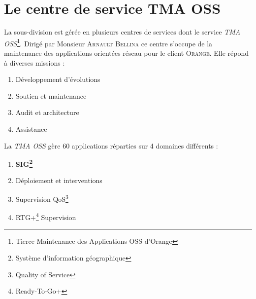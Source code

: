 \section{Le centre de service TMA OSS}

La sous-division est gérée en plusieurs centres de services dont le service \textit{TMA OSS}\footnote{Tierce Maintenance des Applications OSS d’Orange}.
Dirigé par Monsieur \textsc{Arnault Bellina} ce centre s'occupe de la maintenance des applications orientées réseau pour le client \textsc{Orange}.
Elle répond à diverses missions :

\begin{enumerate}
\item Développement d'évolutions
\item Soutien et maintenance
\item Audit et architecture
\item Assistance\\
\end{enumerate}

La \textit{TMA OSS} gère 60 applications réparties sur 4 domaines différents :

\begin{enumerate}
\item \textbf{SIG\footnote{Système d’information géographique }}
\item Déploiement et interventions
\item Supervision QoS\footnote{Quality of Service}
\item RTG+\footnote{Ready-To-Go+} Supervision\\
\end{enumerate}


